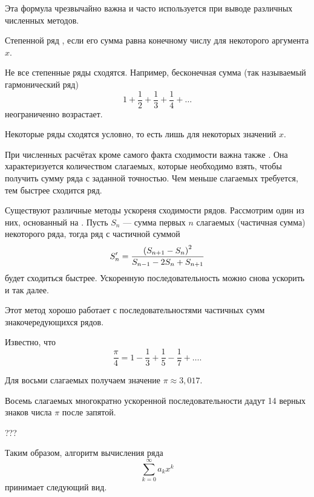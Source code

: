 Эта формула чрезвычайно важна и часто используется при выводе
различных численных методов.


\begin{defn}
Степенной ряд , если его
сумма равна конечному числу для некоторого аргумента $x$.
\end{defn}

Не все степенные ряды сходятся. Например, бесконечная сумма (так
называемый гармонический ряд)
\[
1+\frac{1}{2}+\frac{1}{3}+\frac{1}{4}+\ldots
\]
неограниченно возрастает.

Некоторые ряды сходятся условно, то есть лишь для некоторых значений
$x$.

При численных расчётах кроме самого факта сходимости важна также
. Она характеризуется
количеством слагаемых, которые необходимо взять, чтобы получить сумму
ряда с заданной точностью. Чем меньше слагаемых требуется, тем быстрее
сходится ряд.


Существуют различные методы ускореня сходимости рядов. Рассмотрим один из них,
основанный на . Пусть $S_n$ —
сумма первых $n$ слагаемых (частичная сумма) некоторого ряда, тогда
ряд с частичной суммой
\[
S'_n = {\left(S_{n+1} - S_n\right)^2 \over S_{n-1} - 2 S_n + S_{n+1}}
\]
будет сходиться быстрее. Ускоренную последовательность можно снова
ускорить и так далее.

Этот метод хорошо работает с последовательностями частичных сумм
знакочередующихся рядов.

\begin{example}
Известно, что
\[
\frac{\pi}4 = 1 - \frac13 + \frac15 - \frac17 + \ldots.
\]

Для восьми слагаемых получаем значение $\pi \approx 3{,}017$.

Восемь слагаемых многократно ускоренной последовательности дадут 14
верных знаков числа $\pi$ после запятой.
\end{example}

\Practice


???

Таким образом, алгоритм вычисления ряда
\[
\sum_{k=0}^{\infty}a_{k}x^{k}
\]
принимает следующий вид.


%
%

